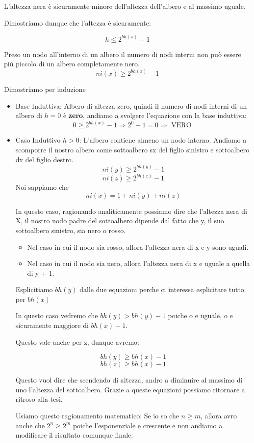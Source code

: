 L'altezza nera è sicuramente minore dell'altezza dell'albero e al massimo uguale.

Dimostriamo dunque che l'altezza è sicuramente:

$$h \le 2^{bh(x)}-1$$

Preso un nodo all'interno di un albero il numero di nodi interni non può essere più piccolo di un albero completamente nero.
$$ n i(x) \ge 2^{bh(x)} -1 $$

Dimostriamo per induzione

\begin{itemize}
	\item Base Induttiva: Albero di altezza zero, quindi il numero di nodi interni di un albero di $h=0$ è \textbf{zero}, andiamo a svolgere l'equazione con la base induttiva:
	$$ 0 \ge 2^{bh(x)}-1 \Rightarrow 2^0-1 = 0 \Rightarrow \text{ VERO }$$
	
	
	\item Caso Induttivo $h > 0$: L'albero contiene almeno un nodo interno. 
	Andiamo a scomporre il nostro albero come sottoalbero sx del figlio sinistro e sottoalbero dx del figlio destro.
	$$ ni(y) \ge 2^{bh(y)}-1 $$
	$$ ni(z) \ge 2^{bh(z)}-1 $$
	Noi sappiamo che 
	$$ ni(x)=1+ni(y)+ni(z) $$
	
	In questo caso, ragionando analiticamente possiamo dire che l'altezza nera di X, il nostro nodo padre del sottoalbero dipende dal fatto che y, il suo sottoalbero sinistro, sia nero o rosso.
	\begin{itemize}
		\item Nel caso in cui il nodo sia rosso, allora l'altezza nera di x e y sono uguali.
		\item Nel caso in cui il nodo sia nero, allora l'altezza nera di x e uguale a quella di y + 1.
	\end{itemize}
	
	Esplicitiamo $bh(y)$ dalle due equazioni perche ci interessa esplicitare tutto per $bh(x)$

	In questo caso vedremo che $bh(y) > bh(y) - 1$ poiche o e uguale, o e sicuramente maggiore di $bh(x) - 1$.
	
	Questo vale anche per z, dunque avremo:
	
	$$bh(y) \ge bh(x) -1$$
	$$bh(z) \ge bh(x) -1$$

	Questo vuol dire che scendendo di altezza, andro a diminuire al massimo di uno l'altezza del sottoalbero. Grazie a queste equazioni possiamo ritornare a ritroso alla tesi.
	

	Usiamo questo ragionamento matematico: Se io so che $n \ge m$, allora avro anche che $ 2^{n} \ge 2^{m}$ poiche l'esponenziale e crescente e non andiamo a modificare il risultato comunque finale. 
	

\end{itemize}
